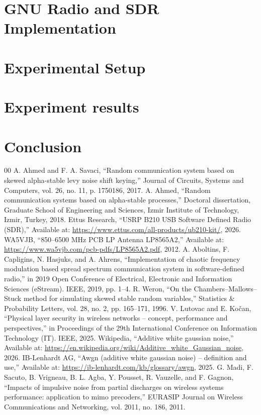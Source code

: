 \documentclass[conference]{IEEEtran}
\begin{document}
\section{GNU Radio and SDR Implementation}
\section{Experimental Setup}
\section{Experiment results}
\section{Conclusion}

\begin{thebibliography}{00}
 A. Ahmed and F. A. Savaci, ``Random communication system based on skewed alpha-stable levy noise shift keying,'' Journal of Circuits, Systems and Computers, vol. 26, no. 11, p. 1750186, 2017.
 A. Ahmed, ``Random communication systems based on alpha-stable processes,'' Doctoral dissertation, Graduate School of Engineering and Sciences, Izmir Institute of Technology, Izmir, Turkey, 2018.
 {Ettus Research}, ``{USRP B210 USB Software Defined Radio (SDR)},'' Available at: \url{https://www.ettus.com/all-products/ub210-kit/}, 2026.
 {WA5VJB}, ``{850--6500 MHz PCB LP Antenna LP8565A2},'' Available at: \url{https://www.wa5vjb.com/pcb-pdfs/LP8565A2.pdf}, 2012.
 A. Aboltins, F. Capligins, N. Hasjuks, and A. Ahrens, ``Implementation of chaotic frequency modulation based spread spectrum communication system in software-defined radio,'' in 2019 Open Conference of Electrical, Electronic and Information Sciences (eStream). IEEE, 2019, pp. 1--4.
 R. Weron, ``On the {Chambers--Mallows--Stuck} method for simulating skewed stable random variables,'' Statistics \& Probability Letters, vol. 28, no. 2, pp. 165--171, 1996.
 V. Lutovac and E. Kočan, ``Physical layer security in wireless networks -- concept, performance and perspectives,'' in Proceedings of the 29th International Conference on Information Technology (IT). IEEE, 2025.
 {Wikipedia}, ``Additive white gaussian noise,'' Available at: \url{https://en.wikipedia.org/wiki/Additive_white_Gaussian_noise}, 2026.
 {IB-Lenhardt AG}, ``Awgn (additive white gaussian noise) -- definition and use,'' Available at: \url{https://ib-lenhardt.com/kb/glossary/awgn}, 2025.
 G. Madi, F. Sacuto, B. Vrigneau, B. L. Agba, Y. Pousset, R. Vauzelle, and F. Gagnon, ``Impacts of impulsive noise from partial discharges on wireless systems performance: application to mimo precoders,'' EURASIP Journal on Wireless Communications and Networking, vol. 2011, no. 186, 2011.

\end{thebibliography}
\end{document}
